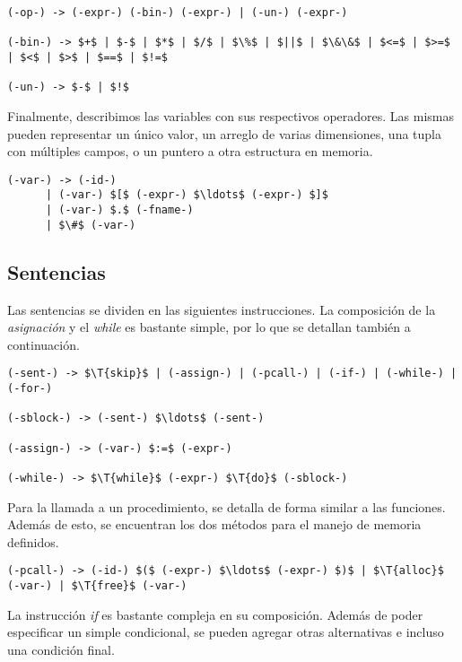 \documentclass{article}
\begin{document}
\begin{lstlisting}[style = syntax]
(-op-) -> (-expr-) (-bin-) (-expr-) | (-un-) (-expr-)

(-bin-) -> $+$ | $-$ | $*$ | $/$ | $\%$ | $||$ | $\&\&$ | $<=$ | $>=$ | $<$ | $>$ | $==$ | $!=$

(-un-) -> $-$ | $!$
\end{lstlisting}

Finalmente, describimos las variables con sus respectivos operadores.
Las mismas pueden representar un único valor, un arreglo de varias dimensiones, una tupla con múltiples campos, o un puntero a otra estructura en memoria. 

\begin{lstlisting}[style = syntax]
(-var-) -> (-id-)
      | (-var-) $[$ (-expr-) $\ldots$ (-expr-) $]$
      | (-var-) $.$ (-fname-)
      | $\#$ (-var-)
\end{lstlisting}

\subsection{Sentencias}

Las sentencias se dividen en las siguientes instrucciones.
La composición de la \textit{asignación} y el \textit{while} es bastante simple, por lo que se detallan también a continuación.

\begin{lstlisting}[style = syntax]
(-sent-) -> $\T{skip}$ | (-assign-) | (-pcall-) | (-if-) | (-while-) | (-for-)

(-sblock-) -> (-sent-) $\ldots$ (-sent-)

(-assign-) -> (-var-) $:=$ (-expr-)

(-while-) -> $\T{while}$ (-expr-) $\T{do}$ (-sblock-)
\end{lstlisting}

Para la llamada a un procedimiento, se detalla de forma similar a las funciones.
Además de esto, se encuentran los dos métodos para el manejo de memoria definidos.

\begin{lstlisting}[style = syntax]
(-pcall-) -> (-id-) $($ (-expr-) $\ldots$ (-expr-) $)$ | $\T{alloc}$ (-var-) | $\T{free}$ (-var-)
\end{lstlisting}

La instrucción \textit{if} es bastante compleja en su composición.
Además de poder especificar un simple condicional, se pueden agregar otras alternativas e incluso una condición final.
\end{document}

